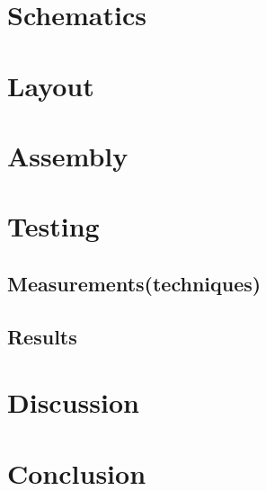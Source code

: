 \documentclass{article}
\begin{document}
\section{Schematics}
\section{Layout}
\section{Assembly}
\section{Testing}
\subsection{Measurements(techniques)}
\subsection{Results}
\section{Discussion}
\section{Conclusion}
\end{document}
